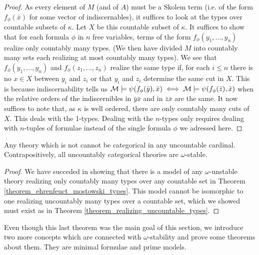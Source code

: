 \begin{proof}
As every element of \(M\) (and of \(A\)) must be a Skolem term (i.e. of the form \(f_\phi(\bar{x})\) for some vector of indiscernables), it suffices to look at the types over countable subsets of \(\kappa\).
Let \(X\) be this countable subset of \(\kappa\). 
It suffices to show that for each formula \(\phi\) in \(n\) free variables, terms of the form \(f_\phi(y_1, \ldots, y_n)\) realize only countably many types. 
(We then have divided \(M\) into countably many sets each realizing at most countably many types).
We see that \(f_\phi(y_1, \ldots, y_n)\) and \(f_\phi(z_1, \ldots, z_n)\) realize the same type if, for each \(i \leq n\) there is no \(x \in X\) between \(y_i\) and \(z_i\) or that \(y_i\) and \(z_i\) determine the same cut in \(X\).  
This is because indiscernability tells us \(\mathcal{M} \models \psi(f_\phi(\bar{y}), \bar{x}) \iff \mathcal{M} \models \psi(f_\phi(\bar{z}), \bar{x})\) when the relative orders of the indiscernibles in \(\bar{y}\bar{x}\) and in \(\bar{z}\bar{x}\) are the same. 
It now suffices to note that, as \(\kappa\) is well ordered, there are only countably many cuts of \(X\). 
This deals with the 1-types. Dealing with the \(n\)-types only requires dealing with \(n\)-tuples of formulae instead of the single formula \(\phi\) we adressed here. 
\end{proof}

\begin{theorem}\label{theorem_omega_stability_categoricity}
Any theory which is not \omst cannot be categorical in any uncountable cardinal. Contrapositively, all uncountably categorical theories are \(\omega\)-stable.
\end{theorem}

\begin{proof}
We have succeded in showing that there is a model of any \(\omega\)-unstable theory realizing only countably many types over any countable set in Theorem \ref{theorem_ehrenfeuct_mostowski_types}.
This model cannot be isomorphic to one realizing uncountably many types over a countable set, which we showed must exist as in Theorem \ref{theorem_realizing_uncountable_types}.
\end{proof}

Even though this last theorem was the main goal of this section, we introduce two more concepts which are connected with \(\omega\)-stability and prove some theorems about them. They are minimal formulae and prime models. 

